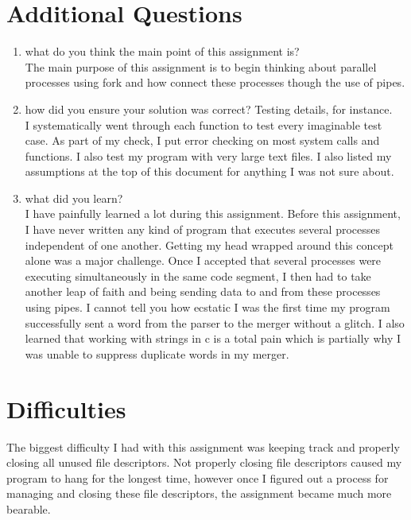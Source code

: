 \documentclass[12pt,letterpaper]{article}
\begin{document}
\section{Additional Questions}
\begin{enumerate}
    \item
    what do you think the main point of this assignment is?
\\
The main purpose of this assignment is to begin thinking about parallel processes using fork and how connect these processes though the use of pipes.

    \item
    how did you ensure your solution was correct? Testing details, for instance.
\\
I systematically went through each function to test every imaginable test case. As part of my check, I put error checking on most system calls and functions. I also test my program with very large text files. I also listed my assumptions at the top of this document for anything I was not sure about.
    
    \item
    what did you learn?
\\
I have painfully learned a lot during this assignment. Before this assignment, I have never written any kind of program that executes several processes independent of one another. Getting my head wrapped around this concept alone was a major challenge. Once I accepted that several processes were executing simultaneously in the same code segment, I then had to take another leap of faith and being sending data to and from these processes using pipes. I cannot tell you how ecstatic I was the first time my program successfully sent a word from the parser to the merger without a glitch. I also learned that working with strings in c is a total pain which is partially why I was unable to suppress duplicate words in my merger.
    
\end{enumerate}

\section{Difficulties}
The biggest difficulty I had with this assignment was keeping track and properly closing all unused file descriptors. Not properly closing file descriptors caused my program to hang for the longest time, however once I figured out a process for managing and closing these file descriptors, the assignment became much more bearable.
\end{document}
